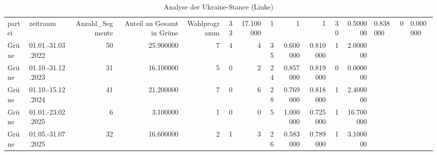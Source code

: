 \begin{table}
\caption{Analyse der Ukraine-Stance (Linke)}
\label{tab:meine_tabelle}
\begin{tabular}{llrrrrrrrrrr}
\toprule
partei & zeitraum & Anzahl_Segmente & Anteil an Gesamt in %
\midrule
Grüne & Wahlprogramm & 33 & 17.100000 & 1 & 1 & 1 & 30 & 0.500000 & 0.838000 & 0 & 0.000000 \\
Grüne & 01.01.-31.03.2022 & 50 & 25.900000 & 7 & 4 & 4 & 35 & 0.600000 & 0.810000 & 1 & 2.000000 \\
Grüne & 01.10.-31.12.2023 & 31 & 16.100000 & 5 & 0 & 2 & 24 & 0.857000 & 0.819000 & 0 & 0.000000 \\
Grüne & 01.10.-15.12.2024 & 41 & 21.200000 & 7 & 0 & 6 & 28 & 0.769000 & 0.818000 & 1 & 2.400000 \\
Grüne & 01.01.-23.02.2025 & 6 & 3.100000 & 1 & 0 & 0 & 5 & 1.000000 & 0.725000 & 1 & 16.700000 \\
Grüne & 01.05.-31.07.2025 & 32 & 16.600000 & 2 & 1 & 3 & 26 & 0.583000 & 0.789000 & 1 & 3.100000 \\
\bottomrule
\end{tabular}
\end{table}
